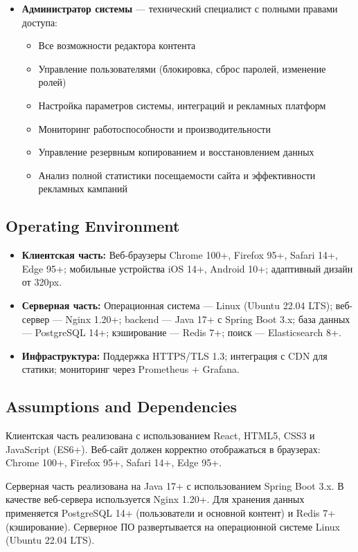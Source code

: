 \begin{itemize}[leftmargin=*]
\begin{itemize}
        \item Просмотр статистики просмотров материалов и базовой рекламной статистики
    \end{itemize}
    \item \textbf{Администратор системы} — технический специалист с полными правами доступа:
    \begin{itemize}
        \item Все возможности редактора контента
        \item Управление пользователями (блокировка, сброс паролей, изменение ролей)
        \item Настройка параметров системы, интеграций и рекламных платформ
        \item Мониторинг работоспособности и производительности
        \item Управление резервным копированием и восстановлением данных
        \item Анализ полной статистики посещаемости сайта и эффективности рекламных кампаний
    \end{itemize}
\end{itemize}

\subsection{Operating Environment}
\begin{itemize}[leftmargin=*]
    \item \textbf{Клиентская часть:} Веб-браузеры Chrome 100+, Firefox 95+, Safari 14+, Edge 95+; мобильные устройства iOS 14+, Android 10+; адаптивный дизайн от 320px.
    \item \textbf{Серверная часть:} Операционная система — Linux (Ubuntu 22.04 LTS); веб-сервер — Nginx 1.20+; backend — Java 17+ с Spring Boot 3.x; база данных — PostgreSQL 14+; кэширование — Redis 7+; поиск — Elasticsearch 8+.
    \item \textbf{Инфраструктура:} Поддержка HTTPS/TLS 1.3; интеграция с CDN для статики; мониторинг через Prometheus + Grafana.
\end{itemize}

\subsection{Assumptions and Dependencies}
\begin{description}[leftmargin=!,labelwidth=\widthof{\bfseries}]
    \item[2.4.1] Клиентская часть реализована с использованием React, HTML5, CSS3 и JavaScript (ES6+). Веб-сайт должен корректно отображаться в браузерах: Chrome 100+, Firefox 95+, Safari 14+, Edge 95+.
    \item[2.4.2] Серверная часть реализована на Java 17+ с использованием Spring Boot 3.x. В качестве веб-сервера используется Nginx 1.20+. Для хранения данных применяется PostgreSQL 14+ (пользователи и основной контент) и Redis 7+ (кэширование). Серверное ПО развертывается на операционной системе Linux (Ubuntu 22.04 LTS).
\end{description}

